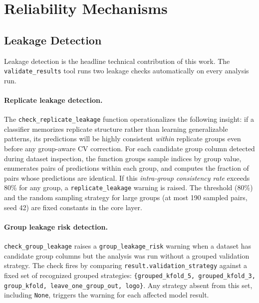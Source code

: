 
\section{Reliability Mechanisms}
\label{sec:reliability}

\subsection{Leakage Detection}
\label{sec:leakage}

Leakage detection is the headline technical contribution of this work.
The \texttt{validate\_results} tool runs two leakage checks automatically on
every analysis run.

\paragraph{Replicate leakage detection.}
The \texttt{check\_replicate\_leakage} function operationalizes the following
insight: if a classifier memorizes replicate structure rather than learning
generalizable patterns, its predictions will be highly consistent
\emph{within} replicate groups even before any group-aware CV correction.
For each candidate group column detected during dataset inspection, the
function groups sample indices by group value, enumerates pairs of predictions
within each group, and computes the fraction of pairs whose predictions are
identical.
If this \emph{intra-group consistency rate} exceeds 80\% for any group, a
\texttt{replicate\_leakage} warning is raised.
The threshold (80\%) and the random sampling strategy for large groups
(at most 190 sampled pairs, seed 42) are fixed constants in the core layer.

\paragraph{Group leakage risk detection.}
\texttt{check\_group\_leakage} raises a \texttt{group\_leakage\_risk} warning
when a dataset has candidate group columns but the analysis was run without a
grouped validation strategy.
The check fires by comparing \texttt{result.validation\_strategy} against a
fixed set of recognized grouped strategies:
\texttt{\{grouped\_kfold\_5, grouped\_kfold\_3, group\_kfold, leave\_one\_group\_out, logo\}}.
Any strategy absent from this set, including \texttt{None}, triggers the
warning for each affected model result.

